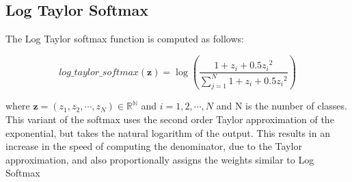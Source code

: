 \documentclass{article}
\begin{document}




\subsection{Log Taylor Softmax}
The Log Taylor softmax function is computed as follows:

\[log\_taylor\_softmax(\textbf{z}) = \log(\frac{1+z_i+0.5{z_i}^2}{\sum_{j=1}^{N} 1+z_i+0.5{z_i}^2})\]

where $\textbf{z} = (z_1,z_2,\cdots,z_N) \in \mathbb{R^N}$ and $i = 1,2,\cdots,N$ and N is the number of classes.
\newline
\newline
This variant of the softmax uses the second order Taylor approximation of the exponential, but takes the natural logarithm of the output. This results in an increase in the speed of computing the denominator, due to the Taylor approximation, and also proportionally assigns the weights similar to Log Softmax

\newpage
\end{document}
